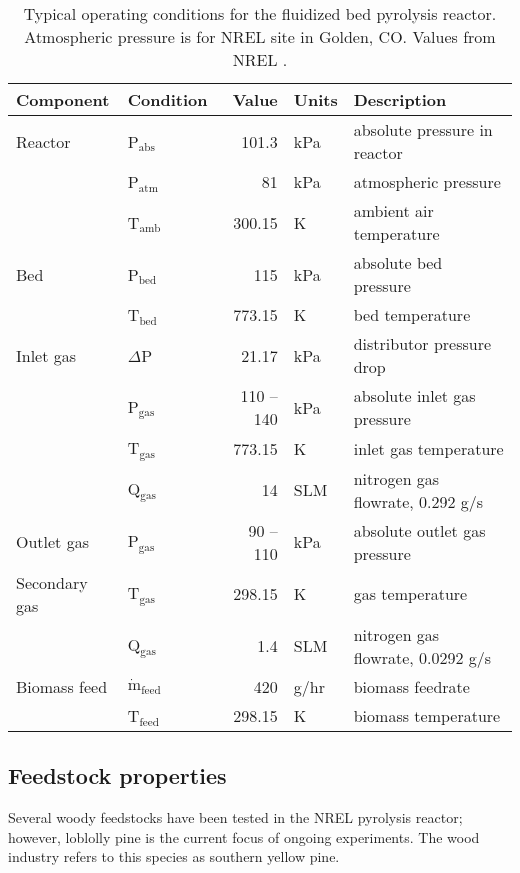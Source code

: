 \begin{table}[H]
    \centering
    \caption{Typical operating conditions for the fluidized bed pyrolysis reactor. Atmospheric pressure is for NREL site in Golden, CO. Values from NREL \cite{French-2019}.}
    \label{tab:operating}
    \begin{tabular}{llrll}
        \toprule
        Component & Condition & Value & Units & Description \\
        \midrule
        Reactor
            & P$_\mathrm{abs}$ & 101.3 & kPa & absolute pressure in reactor \\
            & P$_\mathrm{atm}$ & 81 & kPa & atmospheric pressure \\
            & T$_\mathrm{amb}$ & 300.15 & K & ambient air temperature \\
        Bed
            & P$_\mathrm{bed}$ & 115 & kPa & absolute bed pressure \\
            & T$_\mathrm{bed}$ & 773.15 & K & bed temperature \\
        Inlet gas
            & $\Delta$P & 21.17 & kPa & distributor pressure drop \\
            & P$_\mathrm{gas}$ & 110 -- 140 & kPa & absolute inlet gas pressure \\
            & T$_\mathrm{gas}$ & 773.15 & K & inlet gas temperature \\
            & Q$_\mathrm{gas}$ & 14 & SLM & nitrogen gas flowrate, 0.292 g/s \\
        Outlet gas
            & P$_\mathrm{gas}$ & 90 -- 110 & kPa & absolute outlet gas pressure \\
        Secondary gas
            & T$_\mathrm{gas}$ & 298.15 & K & gas temperature \\
            & Q$_\mathrm{gas}$ & 1.4 & SLM & nitrogen gas flowrate, 0.0292 g/s \\
        Biomass feed
            & $\dot{\textrm{m}}_\textrm{feed}$ & 420 & g/hr & biomass feedrate \\
            & T$_\mathrm{feed}$ & 298.15 & K & biomass temperature \\
        \bottomrule
    \end{tabular}
\end{table}

\subsection{Feedstock properties}

Several woody feedstocks have been tested in the NREL pyrolysis reactor; however, loblolly pine is the current focus of ongoing experiments. The wood industry refers to this species as southern yellow pine.

